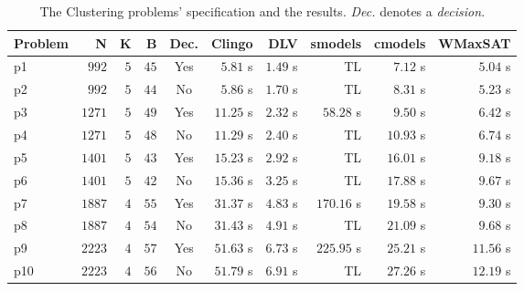\documentclass[]{article}
\begin{document}
\begin{table}[h]
\caption{The Clustering problems' specification and the results. \textit{Dec.} denotes a \textit{decision}.}
\label{tab:clustering_results}
\vspace{1em}
\scriptsize
\centering
\begin{tabular}{lrrrcrrrrr}
\toprule
Problem & N & K & B & Dec. & Clingo & DLV & smodels & cmodels & WMaxSAT \\
\midrule
p1 & $ 992 $ & $ 5 $ & $ 45 $ & Yes & $ 5.81 $ s & $ \mathbf{1.49} $ s & TL & $ 7.12 $ s & $ 5.04 $ s \\
p2 & $ 992 $ & $ 5 $ & $ 44 $ & No & $ 5.86 $ s & $ \mathbf{1.70} $ s & TL & $ 8.31 $ s & $ 5.23 $ s \\
p3 & $ 1271 $ & $ 5 $ & $ 49 $ & Yes & $ 11.25 $ s & $ \mathbf{2.32} $ s & $ 58.28 $ s & $ 9.50 $ s & $ 6.42 $ s \\
p4 & $ 1271 $ & $ 5 $ & $ 48 $ & No & $ 11.29 $ s & $ \mathbf{2.40} $ s & TL & $ 10.93 $ s & $ 6.74 $ s \\
p5 & $ 1401 $ & $ 5 $ & $ 43 $ & Yes & $ 15.23 $ s & $ \mathbf{2.92} $ s & TL & $ 16.01 $ s & $ 9.18 $ s \\
p6 & $ 1401 $ & $ 5 $ & $ 42 $ & No & $ 15.36 $ s & $ \mathbf{3.25} $ s & TL & $ 17.88 $ s & $ 9.67 $ s \\
p7 & $ 1887 $ & $ 4 $ & $ 55 $ & Yes & $ 31.37 $ s & $ \mathbf{4.83} $ s & $ 170.16 $ s & $ 19.58 $ s & $ 9.30 $ s \\
p8 & $ 1887 $ & $ 4 $ & $ 54 $ & No & $ 31.43 $ s & $ \mathbf{4.91} $ s & TL & $ 21.09 $ s & $ 9.68 $ s \\
p9 & $ 2223 $ & $ 4 $ & $ 57 $ & Yes & $ 51.63 $ s & $ \mathbf{6.73} $ s & $ 225.95 $ s & $ 25.21 $ s & $ 11.56 $ s \\
p10 & $ 2223 $ & $ 4 $ & $ 56 $ & No & $ 51.79 $ s & $ \mathbf{6.91} $ s & TL & $ 27.26 $ s & $ 12.19 $ s \\
\bottomrule
\end{tabular}
\end{table}
\end{document}
